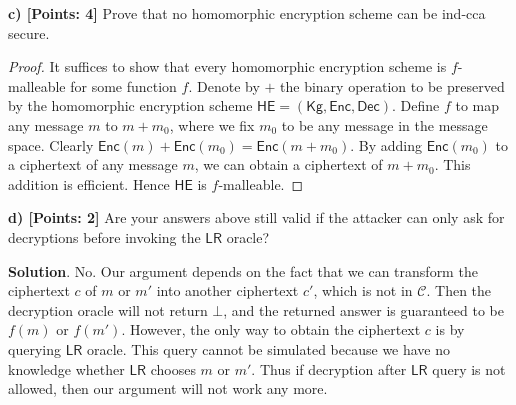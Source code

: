 \documentclass[12pt]{article}
\theoremstyle{definition}
\newcommand{\Kg}{\textsf{Kg}}
\newcommand{\Enc}{\textsf{Enc}}
\newcommand{\Dec}{\textsf{Dec}}
\newcommand{\LR}{\textsf{LR}}
\begin{document}
\newcommand{\HE}{\textsf{HE}}
{\bf c) [Points: 4]} Prove that no homomorphic encryption scheme can be ind-cca secure.
\begin{proof}
It suffices to show that every homomorphic encryption scheme is $f$-malleable for some function $f$.
Denote by $+$ the binary operation to be preserved by the homomorphic encryption scheme $\HE = (\Kg, \Enc, \Dec)$. Define $f$ to map any message $m$ to $m+m_0$, where we fix $m_0$ to be any message in the message space. Clearly $\Enc(m)+\Enc(m_0) = \Enc(m+m_0)$. By adding $\Enc(m_0)$ to a ciphertext of any message $m$, we can obtain a ciphertext of $m+m_0$. This addition is efficient. Hence $\HE$ is $f$-malleable.
\end{proof}

{\bf d) [Points: 2]} Are your answers above still valid if the attacker can only ask for decryptions
before invoking the $\LR$ oracle?

{\bf Solution}. No. Our argument depends on the fact that we can transform the ciphertext $c$ of $m$ or $m'$ into another ciphertext $c'$, which is not in $\mathcal{C}$.
Then the decryption oracle will not return $\bot$, and the returned answer is guaranteed to be $f(m)$ or $f(m')$. 
However, the only way to obtain the ciphertext $c$ is by querying $\LR$ oracle. This query cannot be simulated because we have no knowledge whether $\LR$ chooses $m$ or $m'$. Thus if decryption after $\LR$ query is not allowed, then our argument will not work any more.

\newcommand{\D}{\mathcal{D}}
\newcommand{\G}{\mathbb{G}}
\newcommand{\NP}{\mathcal{NP}}
\newcommand{\ddh}{\textsf{ddh}}
\end{document}
